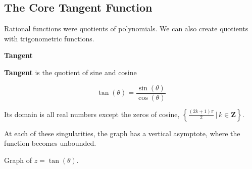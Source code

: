 \documentclass{ximera}
\begin{document}
\subsection*{The Core Tangent Function}


Rational functions were quotients of polynomials.  We can also create quotients with trigonometric functions.


\begin{definition}  \textbf{\textcolor{green!50!black}{Tangent}} 


\textbf{Tangent} is the quotient of sine and cosine


\[   \tan(\theta) = \frac{\sin(\theta)}{\cos(\theta)}      \]



Its domain is all real numbers except the zeros of cosine, $\left\{  \frac{(2k+1)\pi}{2}   \, | \,   k \in \textbf{Z}   \right\}$.

\end{definition}


At each of these singularities, the graph has a vertical asymptote, where the function becomes unbounded.




Graph of $z = \tan(\theta)$.
\end{document}
